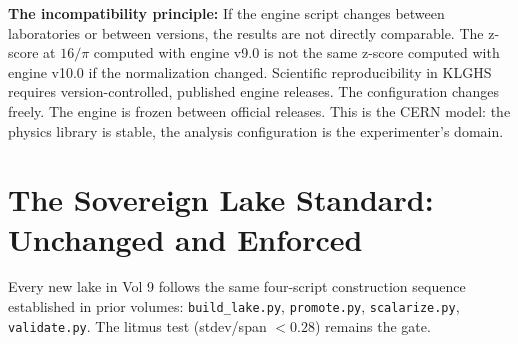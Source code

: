 \documentclass[11pt, letterpaper, openany]{book}
\begin{document}
\begin{warningbox}
\textbf{The incompatibility principle:} If the engine script changes between
laboratories or between versions, the results are not directly comparable.
The z-score at $16/\pi$ computed with engine v9.0 is not the same z-score
computed with engine v10.0 if the normalization changed. Scientific
reproducibility in KLGHS requires version-controlled, published engine
releases. The configuration changes freely. The engine is frozen between
official releases. This is the CERN model: the physics library is stable,
the analysis configuration is the experimenter's domain.
\end{warningbox}

\section{The Sovereign Lake Standard: Unchanged and Enforced}

Every new lake in Vol 9 follows the same four-script construction sequence
established in prior volumes: \texttt{build\_lake.py}, \texttt{promote.py},
\texttt{scalarize.py}, \texttt{validate.py}. The litmus test (stdev/span $< 0.28$)
remains the gate.
\end{document}
